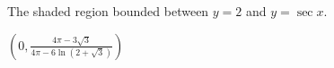 {The shaded region bounded between $y=2$ and $y=\sec x$.\\

\noindent\begin{minipage}{\linewidth}
\centering
{}
\end{minipage}
}
{$\left( 0, \frac{4\pi-3\sqrt3}{4\pi-6\ln\left(2+\sqrt3\right)} \right)$
}
